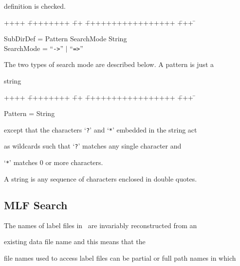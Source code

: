 definition is checked.





{\sf


\begin{tabbing}


++++ \= ++++++++ \= ++ \= +++++++++++++++++ \= +++ \=  \kill


\>   SubDirDef = \> Pattern SearchMode String \\


\>   SearchMode = \> ``\verb+->+'' $|$ ``\verb+=>+''


\end{tabbing}


}


\noindent


The two types of search mode are described below. A pattern is just a 


string


{\sf


\begin{tabbing}


++++ \= ++++++++ \= ++ \= +++++++++++++++++ \= +++ \=  \kill


\>    Pattern = \> String


\end{tabbing}


}


\noindent


except that the characters `\texttt{?}' and `\texttt{*}' embedded in the string act


as wildcards such that `\texttt{?}' matches any single character and


`\texttt{*}' matches 0 or more characters.


A string is any sequence of characters enclosed in double quotes.





\subsection{MLF Search}





The names of label files in \HTK\ are invariably reconstructed from an


existing data file name and this means that the


file names used to access label files can be partial or full path names in which


